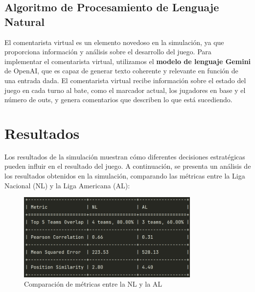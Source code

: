 \documentclass[runningheads]{llncs}
\begin{document}
    \subsection{Algoritmo de Procesamiento de Lenguaje Natural}
        El comentarista virtual es un elemento novedoso en la simulación, ya que proporciona información y análisis sobre el desarrollo del juego. Para implementar el comentarista virtual, utilizamos el \textbf{modelo de lenguaje Gemini} de OpenAI, que es capaz de generar texto coherente y relevante en función de una entrada dada. El comentarista virtual recibe información sobre el estado del juego en cada turno al bate, como el marcador actual, los jugadores en base y el número de outs, y genera comentarios que describen lo que está sucediendo.


\section{Resultados}
    Los resultados de la simulación muestran cómo diferentes decisiones estratégicas pueden influir en el resultado del juego. A continuación, se presenta un análisis de los resultados obtenidos en la simulación, comparando las métricas entre la Liga Nacional (NL) y la Liga Americana (AL):

    \begin{figure}[h]
        \centering
        \includegraphics[width=0.8\textwidth]{metrics_table.png}
        \caption{Comparación de métricas entre la NL y la AL}
    \end{figure}
\end{document}
